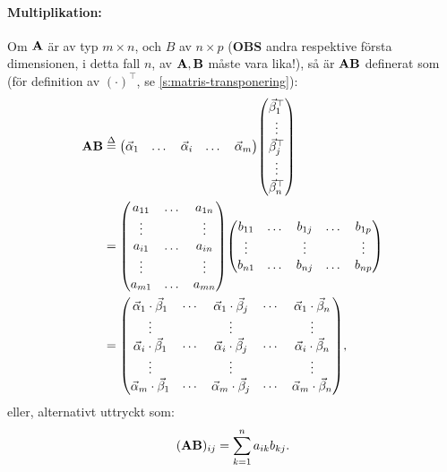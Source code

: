 \paragraph{Multiplikation:} Om $\mathbf{A}$ är av typ $m\times n$, och $B$ av $n\times p$
(\textbf{OBS} andra respektive första dimensionen, i detta fall $n$, av $\mathbf{A},\mathbf{B}$ måste vara lika!),
så är $\mathbf{AB}$ definerat som (för definition av $(\cdot)^\top$, se \ref{s:matris-transponering}):
\begin{align*}
	\mathbf{AB}&\stackrel{\Delta}{=}\qty(\begin{matrix}
		\vec{\alpha}_1&
		\dots&
		\vec{\alpha}_i&
		\dots&
		\vec{\alpha}_m
	\end{matrix})\qty(\begin{matrix}
		\vec{\beta}_1^\top\\
		\vdots\\
		\vec{\beta}_j^\top\\
		\vdots\\
		\vec{\beta}_n^\top
	\end{matrix})\\
	&=\qty(\begin{matrix}
		a_{11}&\dots&a_{1n}\\
		\vdots&&\vdots\\
		a_{i1}&\dots&a_{in}\\
		\vdots&&\vdots\\
		a_{m1}&\dots&a_{mn}
	\end{matrix})\qty(\begin{matrix}
		b_{11}&\dots&b_{1j}&\dots&b_{1p}\\
		\vdots&&\vdots&&\vdots\\
		b_{n1}&\dots&b_{nj}&\dots&b_{np}\\
	\end{matrix})\\
	&=\qty(\begin{matrix}
		\vec{\alpha}_1\cdot\vec{\beta}_1&\cdots&\vec{\alpha}_1\cdot\vec{\beta}_j&\cdots&\vec{\alpha}_1\cdot\vec{\beta}_n\\
		\vdots&&\vdots&&\vdots\\
		\vec{\alpha}_i\cdot\vec{\beta}_1&\cdots&\vec{\alpha}_i\cdot\vec{\beta}_j&\cdots&\vec{\alpha}_i\cdot\vec{\beta}_n\\
		\vdots&&\vdots&&\vdots\\
		\vec{\alpha}_m\cdot\vec{\beta}_1&\cdots&\vec{\alpha}_m\cdot\vec{\beta}_j&\cdots&\vec{\alpha}_m\cdot\vec{\beta}_n
	\end{matrix}),
\end{align*}
eller, alternativt uttryckt som:
$$
	(\mathbf{AB})_{ij}=\sum_{k=1}^na_{ik}b_{kj}.
$$

